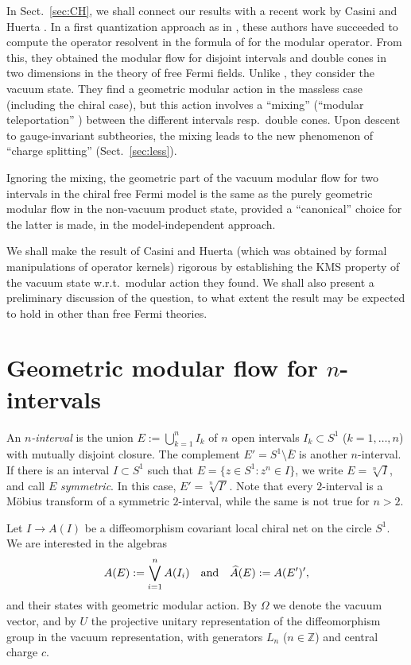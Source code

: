 \documentclass[12pt]{article}
\def \ZZ {{\mathbb Z}}
\def\ovl{\overline}
\def\be{\begin{equation}} \def\bea{\begin{eqnarray}}
\def\ee{\end{equation}}\def\ea{\end{array}}
\newcommand{\qbox}[1]{\quad\hbox{#1}\quad}
\begin{document}
In Sect.\ \ref{sec:CH}, we shall connect our results with a recent
work by Casini and Huerta \cite{CH}. In a first quantization approach
as in \cite{FG}, these authors have succeeded to compute the operator
resolvent in the formula of \cite{FG} for the modular operator. From
this, they obtained the modular flow for disjoint intervals and 
double cones in two dimensions in the theory of free Fermi
fields. Unlike \cite{KL05}, they consider the vacuum state. They find
a geometric modular action in the massless case (including the chiral
case), but this action involves a ``mixing'' (``modular teleportation'' 
\cite{CH}) between the different intervals resp.\ double cones. Upon
descent to gauge-invariant subtheories, the mixing leads to the new
phenomenon of ``charge splitting'' (Sect.\ \ref{sec:less}). 

Ignoring the mixing, the geometric part of the vacuum modular flow for
two intervals in the chiral free Fermi model is the same as the purely
geometric modular flow in the non-vacuum product state, provided a
``canonical'' choice for the latter is made, in the model-independent
approach.     

We shall make the result of Casini and Huerta (which was obtained by
formal manipulations of operator kernels) rigorous by establishing the
KMS property of the vacuum state w.r.t.\ modular action they found. We
shall also present a preliminary discussion of the question, to
what extent the result may be expected to hold in other than free
Fermi theories.   


\section{Geometric modular flow for $n$-intervals}
\label{sec:flow}

An {\em $n$-interval} is the union $E:=\bigcup_{k=1}^n I_k$ of $n$
open intervals $I_k\subset S^1$ ($k=1,\dots,n$) with mutually disjoint 
closure. The complement $E' = S^1\setminus \ovl E$ is another
$n$-interval. If there is an interval $I\subset S^1$ such that
$E=\{z\in S^1: z^n\in I\}$, we write $E=\sqrt[n]I$, and call $E$ 
{\em symmetric}. In this case, $E'=\sqrt[n]{I'}$. Note that every
$2$-interval is a Möbius transform of a symmetric $2$-interval, while
the same is not true for $n>2$.

Let $I\to A(I)$ be a diffeomorphism covariant
local chiral net on the circle $S^1$. 
We are interested in the algebras 
\be 
  A(E):= \bigvee_{i=1}^n A(I_i)\qbox{and} \widehat A(E):= A(E')',
\ee
and their states with geometric modular action. By $\Omega$ we denote
the vacuum vector, and by $U$ the projective unitary representation of
the diffeomorphism group in the vacuum representation, with generators
$L_n$ ($n\in\ZZ$) and central charge $c$. 
\end{document}
